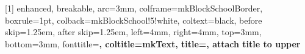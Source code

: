 [1]{
  enhanced,
  breakable,
  arc=3mm,
  colframe=mkBlockSchoolBorder,
  boxrule=1pt,
  colback=mkBlockSchool!5!white,
  coltext=black,
  before skip=1.25em,
  after skip=1.25em,
  left=4mm, right=4mm, top=3mm, bottom=3mm,
  fonttitle=\bfseries,
  coltitle=mkText, 
  title={},
  attach title to upper
}
